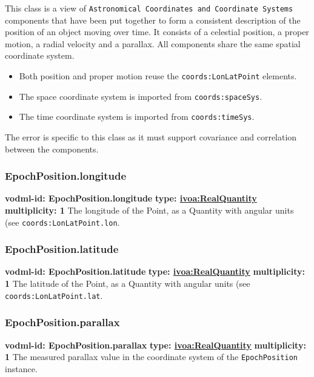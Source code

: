     
  \label{sect:EpochPosition}
    This class is a view of \texttt{Astronomical Coordinates and Coordinate Systems} components that have been put together to form a consistent description of the position of an object moving over time. It consists of a celestial position, a proper motion, a radial velocity and a parallax. All components share the same spatial coordinate system. \begin{itemize} \item Both position and proper motion reuse the \texttt{coords:LonLatPoint} elements. \item The space coordinate system is imported from \texttt{coords:spaceSys}. \item The time coordinate system is imported from \texttt{coords:timeSys}. \end{itemize} The error is specific to this class as it must support covariance and correlation between the components.

    \subsubsection{EpochPosition.longitude}
      \textbf{vodml-id: EpochPosition.longitude} \newline
      \textbf{type: \hyperref[sect:ivoa]{ivoa:RealQuantity}} \newline
      \textbf{multiplicity: 1} \newline 
      The longitude of the Point, as a Quantity with angular units (see \texttt{coords:LonLatPoint.lon}.

    \subsubsection{EpochPosition.latitude}
      \textbf{vodml-id: EpochPosition.latitude} \newline
      \textbf{type: \hyperref[sect:ivoa]{ivoa:RealQuantity}} \newline
      \textbf{multiplicity: 1} \newline 
      The latitude of the Point, as a Quantity with angular units (see \texttt{coords:LonLatPoint.lat}.

    \subsubsection{EpochPosition.parallax}
      \textbf{vodml-id: EpochPosition.parallax} \newline
      \textbf{type: \hyperref[sect:ivoa]{ivoa:RealQuantity}} \newline
      \textbf{multiplicity: 1} \newline 
      The measured parallax value in the coordinate system of the \texttt{EpochPosition} instance.

